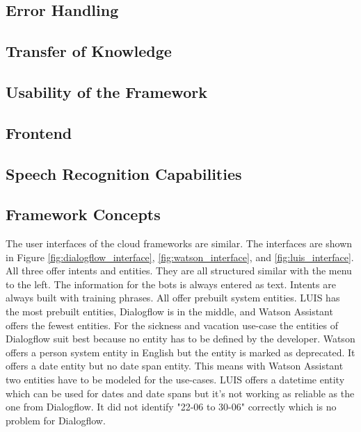 \subsection*{Error Handling}
\subsection*{Transfer of Knowledge}
\subsection*{Usability of the Framework}
\subsection*{Frontend}
\subsection*{Speech Recognition Capabilities}

\subsection*{Framework Concepts}
The user interfaces of the cloud frameworks are similar.
The interfaces are shown in Figure \ref{fig:dialogflow_interface},
\ref{fig:watson_interface}, and \ref{fig:luis_interface}.
All three offer intents and entities.
They are all structured similar with the menu to the left.
The information for the bots is always entered as text.
Intents are always built with training phrases.
All offer prebuilt system entities.
LUIS has the most prebuilt entities, Dialogflow is in the middle,
and Watson Assistant offers the fewest entities.
For the sickness and vacation use-case the entities of 
Dialogflow suit best because no entity has to be defined by 
the developer. 
Watson offers a person system entity in English but the entity
is marked as deprecated.
It offers a date entity but no date span entity.
This means with Watson Assistant two entities have to be 
modeled for the use-cases.
LUIS offers a datetime entity which can be used for dates and 
date spans but it's not working as reliable as the one from 
Dialogflow.
It did not identify "22-06 to 30-06" correctly
which is no problem for Dialogflow.



